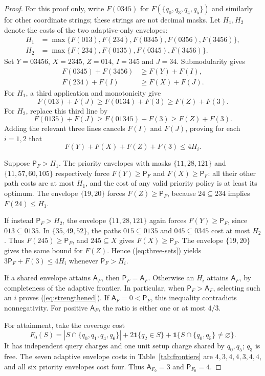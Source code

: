 \documentclass[pdflatex,sn-mathphys-num]{sn-jnl}
\newcommand{\A}{\mathsf{A}}
\newcommand{\Pcost}{\mathsf{P}}
\theoremstyle{thmstyleone}
\theoremstyle{thmstylethree}
\theoremstyle{thmstyletwo}
\begin{document}
\begin{proof}
For this proof only, write $F(0345)$ for $F(\{q_0,q_3,q_4,q_5\})$ and similarly for other coordinate strings; these strings are not decimal masks. Let $H_1,H_2$ denote the costs of the two adaptive-only envelopes:
\begin{align*}
 H_1&=\max\{F(013),F(234),F(0345),F(0356),F(3456)\},\\
 H_2&=\max\{F(234),F(0135),F(0345),F(3456)\}.
\end{align*}
Set $Y=03456$, $X=2345$, $Z=014$, $I=345$ and $J=34$. Submodularity gives
\begin{align*}
 F(0345)+F(3456)&\geq F(Y)+F(I),\\
 F(234)+F(I)&\geq F(X)+F(J).
\end{align*}
For $H_1$, a third application and monotonicity give
\[
 F(013)+F(J)\geq F(0134)+F(3)\geq F(Z)+F(3).
\]
For $H_2$, replace this third line by
\[
 F(0135)+F(J)\geq F(01345)+F(3)\geq F(Z)+F(3).
\]
Adding the relevant three lines cancels $F(I)$ and $F(J)$, proving for each $i=1,2$ that
\begin{equation}\label{eq:three-sets}
 F(Y)+F(X)+F(Z)+F(3)\leq4H_i.
\end{equation}

Suppose $\Pcost_F>H_1$. The priority envelopes with masks $\{11,28,121\}$ and $\{11,57,60,105\}$ respectively force $F(Y)\geq\Pcost_F$ and $F(X)\geq\Pcost_F$: all their other path costs are at most $H_1$, and the cost of any valid priority policy is at least its optimum. The envelope $\{19,20\}$ forces $F(Z)\geq\Pcost_F$, because $24\subseteq234$ implies $F(24)\leq H_1$.

If instead $\Pcost_F>H_2$, the envelope $\{11,28,121\}$ again forces $F(Y)\geq\Pcost_F$, since $013\subseteq0135$. In $\{35,49,52\}$, the paths $015\subseteq0135$ and $045\subseteq0345$ cost at most $H_2$. Thus $F(245)\geq\Pcost_F$, and $245\subseteq X$ gives $F(X)\geq\Pcost_F$. The envelope $\{19,20\}$ gives the same bound for $F(Z)$. Hence (\ref{eq:three-sets}) yields $3\Pcost_F+F(3)\leq4H_i$ whenever $\Pcost_F>H_i$.

If a shared envelope attains $\A_F$, then $\Pcost_F=\A_F$. Otherwise an $H_i$ attains $\A_F$, by completeness of the adaptive frontier. In particular, when $\Pcost_F>\A_F$, selecting such an $i$ proves (\ref{eq:strengthened}). If $\A_F=0<\Pcost_F$, this inequality contradicts nonnegativity. For positive $\A_F$, the ratio is either one or at most $4/3$.

For attainment, take the coverage cost
\begin{equation}\label{eq:coverage}
 F_0(S)=|S\cap\{q_0,q_1,q_4,q_6\}|+2\mathbf1\{q_2\in S\}
       +\mathbf1\{S\cap\{q_0,q_5\}\ne\varnothing\}.
\end{equation}
It has independent query charges and one unit setup charge shared by $q_0,q_5$; $q_3$ is free. The seven adaptive envelope costs in Table~\ref{tab:frontiers} are $4,3,4,4,3,4,4$, and all six priority envelopes cost four. Thus $\A_{F_0}=3$ and $\Pcost_{F_0}=4$.


\end{proof}
\end{document}
